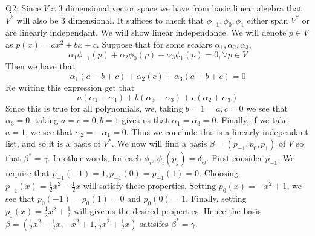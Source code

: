 \documentclass[letterpaper]{article}
\begin{document}
\noindent Q2: Since $V$ a 3 dimensional vector space we have from basic linear algebra that $V^*$ will also be 3 dimensional.
It suffices to check that $\phi_{-1},\phi_0,\phi_1$ either span $V^*$ or are linearly independant. We will show linear independance. We will denote $p\in V$ as $p(x)=ax^2+bx+c$. Suppose that for some scalars $\alpha_1,\alpha_2,\alpha_3$,
$$\alpha_1\phi_{-1}(p) + \alpha_2 \phi_{0}(p) + \alpha_3 \phi_{1}(p)=0, \forall p\in V$$
Then we have that $$\alpha_1(a-b+c)+\alpha_2(c)+\alpha_3(a+b+c)=0$$ Re writing this expression get that 
$$a(\alpha_1+ \alpha_4) + b(\alpha_3-\alpha_3) +c(\alpha_2+\alpha_3)$$ Since this is true for all polynomials, we, taking $b=1=a,c=0$ we see that $\alpha_3=0$, taking $a=c=0,b=1$ gives us that $\alpha_1=\alpha_3=0$.
Finally, if we take $a=1$, we see that $\alpha_2 = -\alpha_1=0$. Thus we conclude this is a linearly independant list, and so it is a basis of $V^*$. 
We now will find a basis $\beta=(p_{-1},p_0,p_1)$ of $V$ so that $\beta^*=\gamma$. In other words, for each $\phi_i$, $\phi_i(p_j)=\delta_{ij}$. First consider $p_{-1}$. We require that $p_{-1}(-1)=1,p_{-1}(0)=p_{-1}(1)=0$. Choosing $p_{-1}(x) = \frac{1}{2}x^2  - \frac{1}{2}x$ will satisfy these properties. 
Setting $p_0(x)=-x^2+1$, we see that $p_0(-1)=p_0(1)=0$ and $p_0(0)=1$. Finally, setting $p_1(x) = \frac{1}{2}x^2 + \frac{1}{2}$ will give us the desired properties. Hence the basis $\beta = (\frac{1}{2}x^2-\frac{1}{2}x,-x^2+1,\frac{1}{2}x^2+\frac{1}{2}x)$ satisifes $\beta^* = \gamma$. 
\end{document}
